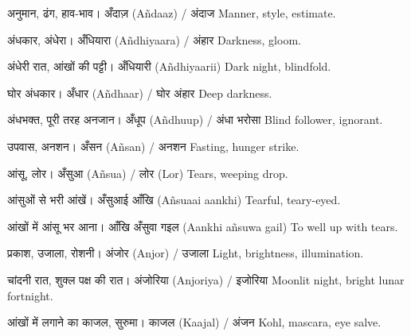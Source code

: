 %
{अनुमान, ढंग, हाव-भाव।}%
{अँदाज़ (Añdaaz) / अंदाज}%
{Manner, style, estimate.}

%
{अंधकार, अंधेरा।}%
{अँधियारा (Añdhiyaara) / अंहार}%
{Darkness, gloom.}

%
{अंधेरी रात, आंखों की पट्टी।}%
{अँधियारी (Añdhiyaarii)}%
{Dark night, blindfold.}

%
{घोर अंधकार।}%
{अँधार (Añdhaar) / घोर अंहार}%
{Deep darkness.}

%
{अंधभक्त, पूरी तरह अनजान।}%
{अँधूप (Añdhuup) / अंधा भरोसा}%
{Blind follower, ignorant.}

%
{उपवास, अनशन।}%
{अँसन (Añsan) / अनशन}%
{Fasting, hunger strike.}

%
{आंसू, लोर।}%
{अँसुआ (Añsua) / लोर (Lor)}%
{Tears, weeping drop.}

%
{आंसुओं से भरी आंखें।}%
{अँसुआई आँखि (Añsuaai aankhi)}%
{Tearful, teary-eyed.}

%
{आंखों में आंसू भर आना।}%
{आँखि अँसुवा गइल (Aankhi añsuwa gail)}%
{To well up with tears.}

%
{प्रकाश, उजाला, रोशनी।}%
{अंजोर (Anjor) / उजाला}%
{Light, brightness, illumination.}

%
{चांदनी रात, शुक्ल पक्ष की रात।}%
{अंजोरिया (Anjoriya) / इजोरिया}%
{Moonlit night, bright lunar fortnight.}

%
{आंखों में लगाने का काजल, सुरुमा।}%
{काजल (Kaajal) / अंजन}%
{Kohl, mascara, eye salve.}

